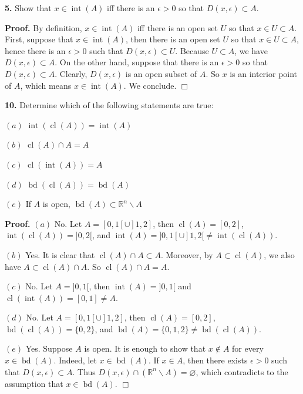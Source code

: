 \documentclass{article}
\begin{document}
    \textbf{5.} Show that $x\in \operatorname{int}(A)$ iff there is an
$\epsilon > 0$ so that $D(x,\epsilon) \subset A$.

\textbf{Proof.} By definition, $x\in \operatorname{int}(A)$ iff there is
an open set $U$ so that $x\in U\subset A$. First, suppose that
$x\in \operatorname{int}(A)$, then there is an open set $U$ so that
$x\in U\subset A$, hence there is an $\epsilon > 0$ such that
$D(x,\epsilon) \subset U$. Because $U \subset A$, we have
$D(x,\epsilon) \subset A$. On the other hand, suppose that there is an
$\epsilon > 0$ so that $D(x,\epsilon)\subset A$. Clearly,
$D(x,\epsilon)$ is an open subset of $A$. So $x$ is an interior point of
$A$, which means $x\in \operatorname{int}(A)$. We conclude. $\Box$

    \textbf{10.} Determine which of the following statements are true:

$(a)$ $\operatorname{int}(\operatorname{cl}(A)) = \operatorname{int}(A)$

$(b)$ $\operatorname{cl}(A)\cap A = A$

$(c)$ $\operatorname{cl}(\operatorname{int}(A)) = A$

$(d)$ $\operatorname{bd}(\operatorname{cl}(A)) = \operatorname{bd}(A)$

$(e)$ If $A$ is open,
$\operatorname{bd}(A) \subset \mathbb{R}^n\backslash A$

\textbf{Proof.} $(a)$ No. Let $A = [0,1[ \cup ]1,2]$, then
$\operatorname{cl}(A) = [0,2]$,
$\operatorname{int}(\operatorname{cl}(A))=]0,2[$, and
$\operatorname{int}(A) = ]0,1[ \cup ]1,2[\neq \operatorname{int}(\operatorname{cl}(A))$.

$(b)$ Yes. It is clear that $\operatorname{cl}(A) \cap A \subset A$.
Moreover, by $A \subset \operatorname{cl}(A)$, we also have
$A \subset \operatorname{cl}(A)\cap A$. So
$\operatorname{cl}(A)\cap A = A$.

$(c)$ No. Let $A = ]0,1[$, then $\operatorname{int}(A) = ]0,1[$ and
$\operatorname{cl}(\operatorname{int}(A)) = [0,1]\neq A$.

$(d)$ No. Let $A = [0,1[\cup ]1,2]$, then
$\operatorname{cl}(A) = [0,2]$,
$\operatorname{bd}(\operatorname{cl}(A)) = \{0,2\}$, and
$\operatorname{bd}(A)=\{ 0,1,2\} \neq \operatorname{bd}(\operatorname{cl}(A))$.

$(e)$ Yes. Suppose $A$ is open. It is enough to show that $x\notin A$
for every $x\in \operatorname{bd}(A)$. Indeed, let
$x\in \operatorname{bd}(A)$. If $x\in A$, then there exists
$\epsilon >0$ such that $D(x,\epsilon)\subset A$. Thus
$D(x,\epsilon)\cap (\mathbb{R}^n\backslash A) = \varnothing$, which
contradicts to the assumption that $x\in \operatorname{bd}(A)$. $\Box$
\end{document}
